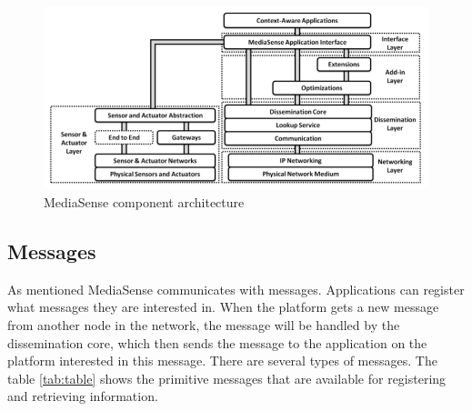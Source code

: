 \begin{figure}[t]
	\centering
	\includegraphics[scale=0.50]{part_2/mediasense/ms_arch.png} 	
	\caption{MediaSense component architecture \cite{Kanter539187} }
\end{figure}

\subsection{Messages}
As mentioned MediaSense communicates with messages. Applications can register what messages they are interested in. When the platform gets a new message from another node in the network, the message will be handled by the dissemination core, which then sends the message to the application on the platform interested in this message. There are several types of messages. The table \ref{tab:table} shows the primitive messages that are available for registering and retrieving information. 

